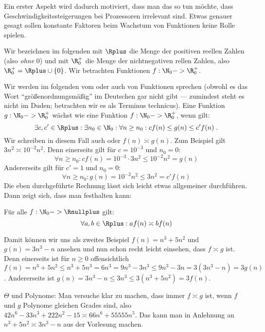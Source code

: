 Ein erster Aspekt wird dadurch motiviert, dass man das so tun möchte,
dass \zB Geschwindigkeitssteigerungen bei Prozessoren irrelevant
sind. Etwas genauer gesagt sollen konstante Faktoren beim Wachstum von
Funktionen keine Rolle spielen.

Wir bezeichnen im folgenden mit $\Rplus$ die Menge der positiven reellen
Zahlen (also \emph{ohne} $0$) und mit $\R_0^+$ die Menge der
nichtnegativen rellen Zahlen, also $\R_0^+=\Rplus \cup\{0\}$. Wir
betrachten Funktionen $f:\N_0 ->\R_0^+$.

Wir werden im folgenden vom  oder auch
 von Funktionen
sprechen (obwohl es das Wort "`größenordnungsmäßig"' im Deutschen gar
nicht gibt --- zumindest steht es nicht im Duden; betrachten wir es
als Terminus technicus). Eine Funktion $g:\N_0 ->\R_0^+$ wächst
 wie eine
Funktion $f:\N_0 ->\R_0^+$, wenn gilt:
\[
\exists c,c'\in \Rplus: \exists n_0\in \N_0: \forall n\geq n_0: c f(n)
\leq g(n) \leq c' f(n) \;.
\]
Wir schreiben in diesem Fall auch  oder $f(n)\asymp g(n)$.  Zum Beispiel gilt $3n^2 \asymp 10^{-2}
n^2$. Denn einerseits gilt für $c= 10^{-3}$ und $n_0=0$:
\[
\forall n\geq n_0: c f(n) = 10^{-3}\cdot 3n^2 \leq 10^{-2} n^2 = g(n)
\]
Andererseits gilt \zB für $c'=1$ und $n_0=0$:
\[
\forall n\geq n_0: g(n)=10^{-2} n^2 \leq 3 n^2 = c' f(n)
\]
%
Die eben durchgeführte Rechnung lässt sich leicht etwas allgemeiner
durchführen. Dann zeigt sich, dass man festhalten kann:

\begin{punkt}[Rechenregel]
  \label{rr:a-b-asymp}
  Für alle $f:\N_0 -> \Rnullplus$ gilt:
  \[
  \forall a,b\in\Rplus:  a f(n) \asymp b f(n)
  \]
\end{punkt}
% 
Damit können wir uns als zweites Beispiel $f(n)=n^3+5n^2$ und
$g(n)=3n^3-n$ ansehen und nun schon recht leicht einsehen, dass
$f\asymp g$ ist. Denn einerseits ist für $n\geq 0$ offensichtlich
$f(n)=n^3+5n^2 \leq n^3+5n^3 = 6n^3 = 9n^3-3n^3\leq
9n^3-3n=3(3n^3-n)=3g(n)$. Andererseits ist $g(n) = 3n^3-n \leq 3n^3
\leq 3(n^3+5n^2) = 3f(n)$.

\begin{tutorium}
  $\Theta$ und Polynome: Man versuche klar zu machen, dass immer
  $f\asymp g$ ist, wenn $f$ und $g$ Polynome gleichen Grades sind,
  also \zB $42n^6-33n^3+222n^2 -15 \asymp 66n^6+55555n^5$. Das kann
  man \zB in Anlehnung an $n^3+5n^2\asymp 3n^3-n$ aus der Vorlesung
  machen.
\end{tutorium}

